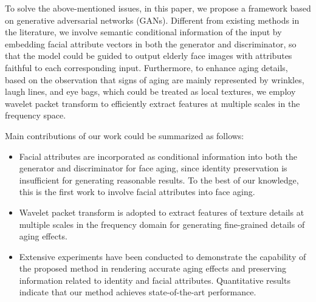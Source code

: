 \documentclass[10pt,twocolumn,letterpaper]{article}
\begin{document}
To solve the above-mentioned issues, in this paper, we propose a framework based on generative adversarial networks (GANs). 
Different from existing methods in the literature, we involve semantic conditional information of the input by embedding facial attribute vectors in both the generator and discriminator, so that the model could be guided to output elderly face images with attributes faithful to each corresponding input.
Furthermore, to enhance aging details, based on the observation that signs of aging are mainly represented by wrinkles, laugh lines, and eye bags, which could be treated as local textures, we employ wavelet packet transform to efficiently extract features at multiple scales in the frequency space. 

Main contributions of our work could be summarized as follows:
\begin{itemize}
\item Facial attributes are incorporated as conditional information into both the generator and discriminator for face aging, since identity preservation is insufficient for generating reasonable results. To the best of our knowledge, this is the first work to involve facial attributes into face aging.

\item Wavelet packet transform is adopted to extract features of texture details at multiple scales in the frequency domain for generating fine-grained details of aging effects.

\item Extensive experiments have been conducted to demonstrate the capability of the proposed method in rendering accurate aging effects and preserving information related to identity and facial attributes. Quantitative results indicate that our method achieves state-of-the-art performance.
\end{itemize}
\end{document}
